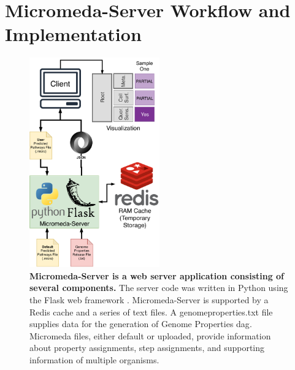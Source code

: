 \section{Micromeda-Server Workflow and Implementation} \label{server-workflow}

\begin{figure}[!ht]
  \centering
	\includegraphics[width=0.50\textwidth]{media/Micromeda-Server.pdf}
	 \caption[Micromeda-Server is a web server application consisting of several 
components.]{\textbf{Micromeda-Server is a web server application consisting of 
several components.} The server code was written in Python using the Flask web 
framework \cite{grinberg2018flask}. Micromeda-Server is supported by a Redis 
cache and a series of text files. A genomeproperties.txt file supplies data for 
the generation of Genome Properties \gls{dag}. Micromeda files, either default 
or uploaded, provide information about property assignments, step assignments, 
and supporting information of multiple organisms.}
	 \label{fig:micromeda-server}
\end{figure}

